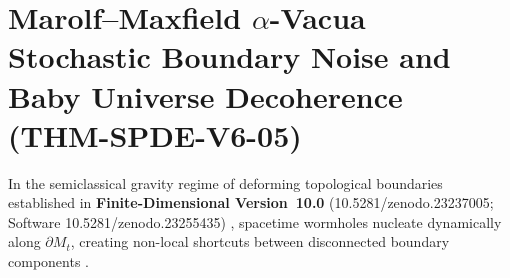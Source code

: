 \documentclass[11pt,a4paper,reqno]{article}
\def\texttt#1{#1}%
\def\mathcal#1{#1}%
\def\zenodo#1{10.5281/zenodo.#1}%
\newcommand{\zenodo}[1]{\href{https://doi.org/10.5281/zenodo.#1}{\texttt{10.5281/\allowbreak zenodo.#1}}}
\theoremstyle{plain}
\theoremstyle{definition}
\theoremstyle{remark}
\numberwithin{equation}{section}
\begin{document}
\section{Marolf--Maxfield \texorpdfstring{$\alpha$}{alpha}-Vacua Stochastic Boundary Noise and Baby Universe Decoherence (\texttt{THM-SPDE-V6-05})}
\label{sec:marolf_maxfield}

In the semiclassical gravity regime of deforming topological boundaries established in \textbf{Finite-Dimensional Version~10.0} (\zenodo{23237005}; Software \zenodo{23255435}) \cite{ananda2026finite_v100}, spacetime wormholes nucleate dynamically along $\partial\mathcal{M}_t$, creating non-local shortcuts between disconnected boundary components \cite{marolf2020transcending}.
\end{document}
